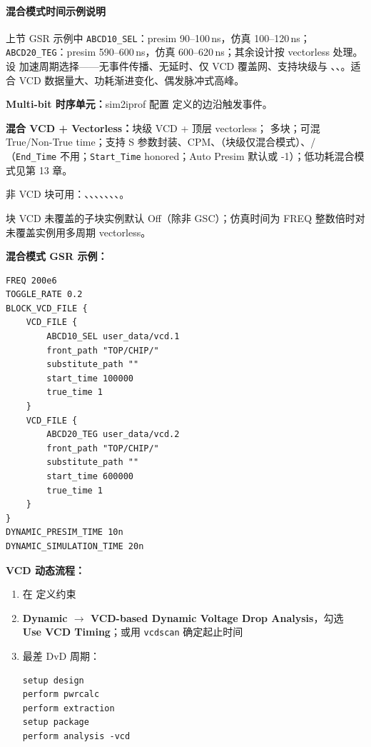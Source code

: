 \paragraph{混合模式时间示例说明}
上节 GSR 示例中 \texttt{ABCD10\_SEL}：presim 90--100\,ns，仿真 100--120\,ns；\texttt{ABCD20\_TEG}：presim 590--600\,ns，仿真 600--620\,ns；其余设计按 vectorless 处理。
设  加速周期选择——无事件传播、无延时、仅 VCD 覆盖网、支持块级与 、、。适合 VCD 数据量大、功耗渐进变化、偶发脉冲式高峰。

\textbf{Multi-bit 时序单元：}sim2iprof 配置  定义的边沿触发事件。

\textbf{混合 VCD + Vectorless：}块级 VCD + 顶层 vectorless； 多块；可混 True/Non-True time；支持 S 参数封装、CPM、（块级仅混合模式）、/（\texttt{End\_Time} 不用；\texttt{Start\_Time}  honored；Auto Presim 默认或 -1）；低功耗混合模式见第 13 章。

非 VCD 块可用：、、、、、、、。

块 VCD 未覆盖的子块实例默认 Off（除非 GSC）；仿真时间为 FREQ 整数倍时对未覆盖实例用多周期 vectorless。

\textbf{混合模式 GSR 示例：}
\begin{lstlisting}
FREQ 200e6
TOGGLE_RATE 0.2
BLOCK_VCD_FILE {
    VCD_FILE {
        ABCD10_SEL user_data/vcd.1
        front_path "TOP/CHIP/"
        substitute_path ""
        start_time 100000
        true_time 1
    }
    VCD_FILE {
        ABCD20_TEG user_data/vcd.2
        front_path "TOP/CHIP/"
        substitute_path ""
        start_time 600000
        true_time 1
    }
}
DYNAMIC_PRESIM_TIME 10n
DYNAMIC_SIMULATION_TIME 20n
\end{lstlisting}

\textbf{VCD 动态流程：}
\begin{enumerate}
  \item 在  定义约束
  \item \textbf{Dynamic $\rightarrow$ VCD-based Dynamic Voltage Drop Analysis}，勾选 \textbf{Use VCD Timing}；或用 \texttt{vcdscan} 确定起止时间
  \item 最差 DvD 周期：
\begin{lstlisting}
setup design
perform pwrcalc
perform extraction
setup package
perform analysis -vcd
\end{lstlisting}
\end{enumerate}

